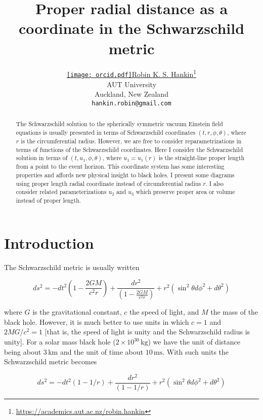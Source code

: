 \documentclass{article}
\title{Proper radial distance as a coordinate in the Schwarzschild metric}
\author{ \href{https://orcid.org/0000-0001-5982-0415}{\texttt{[image: orcid.pdf]}\hspace{1mm}Robin K. S. Hankin}\thanks{
\url{https://academics.aut.ac.nz/robin.hankin}}\\
              AUT University\\
              Auckland, New Zealand\\
	\texttt{hankin.robin@gmail.com} \\
}
\begin{document}
\maketitle

\begin{abstract}
The Schwarzschild solution to the spherically symmetric vacuum
Einstein field equations is usually presented in terms of
Schwarzschild coordinates $(t,r,\phi,\theta)$, where $r$ is the
circumferential radius.  However, we are free to consider
reparametrizations in terms of functions of the Schwarzschild
coordinates.  Here I consider the Schwarzschild solution in terms of
$(t,u_1,\phi,\theta)$, where $u_1=u_1(r)$ is the straight-line proper
length from a point to the event horizon.  This coordinate system has
some interesting properties and affords new physical insight to black
holes.  I present some diagrams using proper length radial coordinate
instead of circumferential radius $r$.  I also consider related
parameterizations $u_2$ and $u_3$ which preserve proper area or volume
instead of proper length.
\end{abstract}



\section{Introduction}
The Schwarzschild metric \citep{schwarzschild1916} is usually written

\begin{equation}
  ds^2=-dt^2\left(1-\frac{2GM}{c^2r}\right)
  +\frac{dr^2}{\left(1-\frac{2GM}{c^2r}\right)} + r^2(\sin^2\theta
  d\phi^2 + d\theta^2)
\end{equation}

where $G$ is the gravitational constant, $c$ the speed of light, and
$M$ the mass of the black hole.  However, it is much better to use
units in which $c=1$ and $2MG/c^2=1$ [that is, the speed of light is
  unity and the Schwarzschild radius is unity].  For a solar mass
black hole ($2\times 10^{30}\,\mathrm{kg}$) we have the unit of
distance being about $3\,\mathrm{km}$ and the unit of time about
$10\,\mathrm{ms}$.  With such units the Schwarzschild metric becomes

\begin{equation}
  ds^2=-dt^2\left(1-1/r\right)
  +\frac{dr^2}{\left(1-1/r\right)} + r^2(\sin^2\theta d\phi^2 + d\theta^2)
\end{equation}
\end{document}
